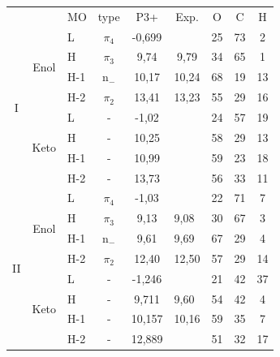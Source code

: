 \documentclass[a4paper,fleqn]{cas-dc}
\begin{document}

\begin{table}[t]
    \begin{tabular}{cclcccccc}
    \hline
                        &                       &  MO     & type          & P3+    & Exp.                      & O  & C  & H  \\ \cline{3-9}
    \multirow{8}{*}{I}  & \multirow{4}{*}{Enol} &L      &   $\pi_4$       & -0,699 &                           & 25 & 73 & 2  \\
                        &                       &H      &   $\pi_3$       & 9,74   & 9,79                      & 34 & 65 & 1  \\
                        &                       &H-1    &   n$_-$         & 10,17  & 10,24                     & 68 & 19 & 13 \\
                        &                       &H-2    &   $\pi_2$       & 13,41  & 13,23                     & 55 & 29 & 16 \\ \cline{2-9}
                        & \multirow{4}{*}{Keto} &L      &   -             & -1,02  &                           & 24 & 57 & 19 \\
                        &                       &H      &   -             & 10,25  &                           & 58 & 29 & 13 \\
                        &                       &H-1    &   -             & 10,99  &                           & 59 & 23 & 18 \\
                        &                       &H-2    &   -             & 13,73  &                           & 56 & 33 & 11 \\ \hline
    \multirow{8}{*}{II} & \multirow{4}{*}{Enol} &L      &   $\pi_4$       & -1,03  &                           & 22 & 71 & 7  \\
                        &                       &H      &   $\pi_3$       & 9,13   & \multicolumn{1}{l}{9,08}  & 30 & 67 & 3  \\
                        &                       &H-1    &   n$_-$         & 9,61   & \multicolumn{1}{l}{9,69}  & 67 & 29 & 4  \\
                        &                       &H-2    &   $\pi_2$       & 12,40  & \multicolumn{1}{l}{12,50} & 57 & 29 & 14 \\ \cline{2-9}
                        & \multirow{4}{*}{Keto} &L      &   -             & -1,246 &                           & 21 & 42 & 37 \\
                        &                       &H      &   -             & 9,711  & \multicolumn{1}{l}{9,60}  & 54 & 42 & 4  \\
                        &                       &H-1    &   -             & 10,157 & \multicolumn{1}{l}{10,16} & 59 & 35 & 7  \\
                        &                       &H-2    &   -             & 12,889 &                           & 51 & 32 & 17 \\ \hline 
    \end{tabular}
    \end{table}
\end{document}
